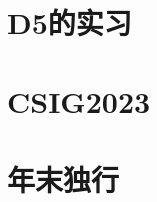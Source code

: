 \documentclass{si_template/cn_note}
\begin{document}
\frontmatter
\mainmatter

\chapter{D5的实习}
\chapter{CSIG2023}
\chapter{年末独行}

\backmatter
\end{document}
